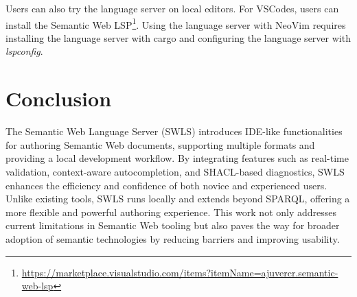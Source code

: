 Users can also try the language server on local editors.
For VSCodes, users can install the Semantic Web LSP\footnote{\url{https://marketplace.visualstudio.com/items?itemName=ajuvercr.semantic-web-lsp}}.
Using the language server with NeoVim requires installing the language server with cargo and configuring the language server with \textit{lspconfig}.

\section{Conclusion}

The Semantic Web Language Server (SWLS) introduces IDE-like functionalities for authoring Semantic Web documents, supporting multiple formats and providing a local development workflow. By integrating features such as real-time validation, context-aware autocompletion, and SHACL-based diagnostics, SWLS enhances the efficiency and confidence of both novice and experienced users. Unlike existing tools, SWLS runs locally and extends beyond SPARQL, offering a more flexible and powerful authoring experience. This work not only addresses current limitations in Semantic Web tooling but also paves the way for broader adoption of semantic technologies by reducing barriers and improving usability.



